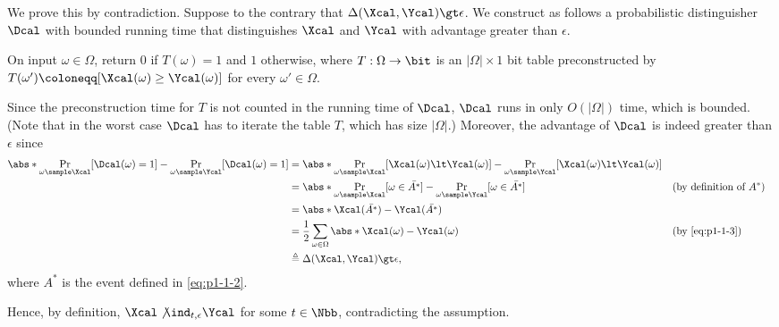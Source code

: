 \begin{answer}[ii]
    We prove this by contradiction. Suppose to the contrary that $\Delta(\Xcal, \Ycal)\gt \epsilon$. We construct as follows a probabilistic distinguisher $\Dcal$ with bounded running time that distinguishes $\Xcal$ and  $\Ycal$ with advantage greater than $\epsilon$.
    \begin{simplebox}
        On input $\omega\in\Omega$, return $0$ if $T(\omega)=1$ and $1$ otherwise, where $T: \Omega\to \bit$ is an $|\Omega| \times 1$ bit table preconstructed by $T(\omega')\coloneqq [\Xcal(\omega) \ge \Ycal(\omega)]$ for every $\omega' \in \Omega$.
    \end{simplebox}
    Since the preconstruction time for $T$ is not counted in the running time of $\Dcal$, $\Dcal$ runs in only $O(|\Omega|)$ time, which is bounded. (Note that in the worst case $\Dcal$ has to iterate the table $T$, which has size $|\Omega|$.)
    Moreover, the advantage of $\Dcal$ is indeed greater than $\epsilon$ since
    \begin{align*}
        \abs*{\Pr_{\omega\sample \Xcal}[\Dcal(\omega)=1]-\Pr_{\omega\sample \Ycal}[\Dcal(\omega)=1]}
        &=\abs*{\Pr_{\omega\sample \Xcal}[\Xcal(\omega)\lt \Ycal(\omega)]-\Pr_{\omega\sample \Ycal}[\Xcal(\omega)\lt \Ycal(\omega)]}\\
        &=\abs*{\Pr_{\omega\sample \Xcal}[\omega\in \bar{A^\ast}]-\Pr_{\omega\sample \Ycal}[\omega\in \bar{A^\ast}]}
        && (\textrm{by definition of } A^\ast)\\
        &=\abs*{\Xcal(\bar{A^\ast})-\Ycal(\bar{A^\ast})}\\
        &= \frac{1}{2}\sum_{\omega\in\Omega}\abs*{\Xcal(\omega)-\Ycal(\omega)}
        && \textrm{(by \eqref{eq:p1-1-3})}\\
        &\triangleq \Delta(\Xcal, \Ycal)\gt \epsilon,
    \end{align*}
    where $A^\ast$ is the event defined in \eqref{eq:p1-1-2}.

    Hence, by definition, $\Xcal\not\ind_{t,\epsilon} \Ycal$ for some $t\in\Nbb$, contradicting the assumption.
\end{answer}



